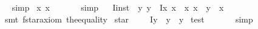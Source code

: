 \begin{isabellebody}
\isadelimproof
\ %
\endisadelimproof
%
\isatagproof
{}\isamarkupfalse%
\ simp%
\endisatagproof
{\isafoldproof}%
%
\isadelimproof
%
\endisadelimproof
\isanewline
\isanewline
{}\isamarkupfalse%
\ {\isachardoublequoteopen}{\isacharparenleft}\isactrlbold {\isasymexists}x{\isachardot}\ x\ \isactrlbold {\isacharequal}\ {\isasymalpha}{\isacharparenright}\ {\isasymlongrightarrow}\ {\isasymA}{\isacharparenleft}{\isasymalpha}{\isacharparenright}{\isachardoublequoteclose}%
\isadelimproof
\ %
\endisadelimproof
%
\isatagproof
{}\isamarkupfalse%
\ simp%
\endisatagproof
{\isafoldproof}%
%
\isadelimproof
%
\endisadelimproof
\isanewline
\ \isanewline
\isanewline
\isanewline
{}\isamarkupfalse%
\ I{}{\isacharunderscore}inst\ {\isacharcolon}\ {\isachardoublequoteopen}\isactrlbold {\isasymforall}y{\isachardot}\ {\isacharparenleft}{\isacharparenleft}y\ \isactrlbold {\isacharequal}\ {\isacharparenleft}\isactrlbold Ix{\isachardot}\ {\isasymPhi}{\isacharparenleft}x{\isacharparenright}{\isacharparenright}{\isacharparenright}\ \isactrlbold {\isasymleftrightarrow}\ {\isacharparenleft}\isactrlbold {\isasymforall}x{\isachardot}\ {\isacharparenleft}{\isacharparenleft}x\ \isactrlbold {\isacharequal}\ y{\isacharparenright}\ \isactrlbold {\isasymleftrightarrow}\ {\isasymPhi}{\isacharparenleft}x{\isacharparenright}{\isacharparenright}{\isacharparenright}{\isacharparenright}{\isachardoublequoteclose}%
\isadelimproof
\ %
\endisadelimproof
%
\isatagproof
{}\isamarkupfalse%
\ {\isacharparenleft}smt\ f{\isacharunderscore}star{\isacharunderscore}axiom\ the{\isacharunderscore}equality{\isacharparenright}%
\endisatagproof
{\isafoldproof}%
%
\isadelimproof
%
\endisadelimproof
\isanewline
\isanewline
\isanewline
{}\isamarkupfalse%
\ star\ {\isacharparenleft}{\isachardoublequoteopen}{\isasymOtimes}{\isachardoublequoteclose}{\isacharparenright}\ \ {\isachardoublequoteopen}{\isasymOtimes}\ {\isasymequiv}\ \isactrlbold Iy{\isachardot}\ \isactrlbold {\isasymnot}\ {\isacharparenleft}y\ \isactrlbold {\isacharequal}\ y{\isacharparenright}{\isachardoublequoteclose}\isanewline
\isanewline
{}\isamarkupfalse%
\ test\ {\isacharcolon}\ {\isachardoublequoteopen}{\isasymOtimes}\ {\isacharequal}\ \isactrlbold {\isasymstar}{\isachardoublequoteclose}%
\isadelimproof
\ %
\endisadelimproof
%
\isatagproof
{}\isamarkupfalse%
\ simp%
\endisatagproof
{\isafoldproof}%
%
\isadelimproof
%
\endisadelimproof
\isanewline
\isanewline
\isanewline
{}\isamarkupfalse%

\end{isabellebody}
